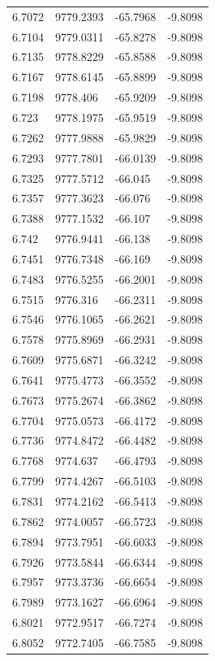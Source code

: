 \begin{table}[H]
\begin{tabular}{llll}
6.7072 & 9779.2393 & -65.7968 & -9.8098 \\
6.7104 & 9779.0311 & -65.8278 & -9.8098 \\
6.7135 & 9778.8229 & -65.8588 & -9.8098 \\
6.7167 & 9778.6145 & -65.8899 & -9.8098 \\
6.7198 & 9778.406 & -65.9209 & -9.8098 \\
6.723 & 9778.1975 & -65.9519 & -9.8098 \\
6.7262 & 9777.9888 & -65.9829 & -9.8098 \\
6.7293 & 9777.7801 & -66.0139 & -9.8098 \\
6.7325 & 9777.5712 & -66.045 & -9.8098 \\
6.7357 & 9777.3623 & -66.076 & -9.8098 \\
6.7388 & 9777.1532 & -66.107 & -9.8098 \\
6.742 & 9776.9441 & -66.138 & -9.8098 \\
6.7451 & 9776.7348 & -66.169 & -9.8098 \\
6.7483 & 9776.5255 & -66.2001 & -9.8098 \\
6.7515 & 9776.316 & -66.2311 & -9.8098 \\
6.7546 & 9776.1065 & -66.2621 & -9.8098 \\
6.7578 & 9775.8969 & -66.2931 & -9.8098 \\
6.7609 & 9775.6871 & -66.3242 & -9.8098 \\
6.7641 & 9775.4773 & -66.3552 & -9.8098 \\
6.7673 & 9775.2674 & -66.3862 & -9.8098 \\
6.7704 & 9775.0573 & -66.4172 & -9.8098 \\
6.7736 & 9774.8472 & -66.4482 & -9.8098 \\
6.7768 & 9774.637 & -66.4793 & -9.8098 \\
6.7799 & 9774.4267 & -66.5103 & -9.8098 \\
6.7831 & 9774.2162 & -66.5413 & -9.8098 \\
6.7862 & 9774.0057 & -66.5723 & -9.8098 \\
6.7894 & 9773.7951 & -66.6033 & -9.8098 \\
6.7926 & 9773.5844 & -66.6344 & -9.8098 \\
6.7957 & 9773.3736 & -66.6654 & -9.8098 \\
6.7989 & 9773.1627 & -66.6964 & -9.8098 \\
6.8021 & 9772.9517 & -66.7274 & -9.8098 \\
6.8052 & 9772.7405 & -66.7585 & -9.8098 \\

\end{tabular}
\end{table}
